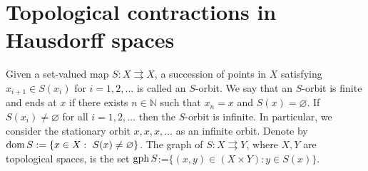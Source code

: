 \documentclass{article}
\def\dom{\mathop{\rm dom}}
\def\gph{\mathop{\rm gph}}
\renewcommand{\emptyset}{\varnothing}
\def\dom{\mathop{\rm dom}}
\def\gph{\mathop{\rm gph}}
\def\dom{\mathop{\rm dom}}
\newcommand{\N}{\mathbb{N}}
\begin{document}






\section{Topological contractions in Hausdorff spaces}

Given a set-valued map $S: X \rightrightarrows X$, a succession of points in $X$ satisfying $x_{i+1}\in S(x_i)$ for $i=1,2,\dots $ is called an $S$-orbit. We say that an $S$-orbit is finite and ends at $x$ if there exists $n \in \N$ such that $x_n=x$ and $S(x)= \emptyset$. If $S(x_i) \neq \emptyset$ for all $i=1,2,\dots $ then the $S$-orbit is infinite. In particular, we consider the stationary orbit $x,x,x, \dots$ as an infinite orbit. Denote by $\dom S := \{x\in X:\ S(x) \neq \emptyset\}$. The graph of $S:X \rightrightarrows Y$, where $X,Y$ are topological spaces, is the set $\gph S$:=$\{(x,y) \in (X \times Y): y \in S(x)\}$.   

\end{document}
